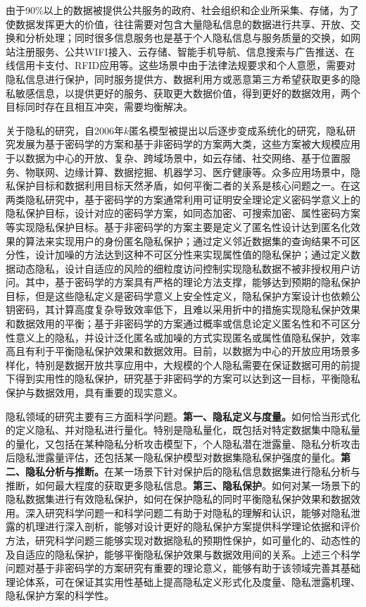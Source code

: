 \documentclass[pdftex,notypeinfo,twoside,openany,UTF8,fntef]{CASthesis}
\theoremstyle{THrm}{
	\newtheorem{question}{Question}[section]
	\newtheorem{property}{性质}[section]
	\newtheorem{assumption}{假设}[section]
	\newtheorem{claim}[lemma]{断言}
	
}
\begin{document}
由于90\%以上的数据被提供公共服务的政府、社会组织和企业所采集、存储，为了使数据发挥更大的价值，往往需要对包含大量隐私信息的数据进行共享、开放、交换和分析处理；同时很多信息服务也是基于个人隐私信息与服务质量的交换，如网站注册服务、公共WIFI接入、云存储、智能手机导航、信息搜索与广告推送、在线信用卡支付、RFID应用等。这些场景中由于法律法规要求和个人意愿，需要对隐私信息进行保护，同时服务提供方、数据利用方或恶意第三方希望获取更多的隐私敏感信息，以提供更好的服务、获取更大数据价值，得到更好的数据效用，两个目标同时存在且相互冲突，需要均衡解决。

关于隐私的研究，自2006年$k$匿名模型被提出以后逐步变成系统化的研究，隐私研究发展为基于密码学的方案和基于非密码学的方案两大类，这些方案被大规模应用于以数据为中心的开放、复杂、跨域场景中，如云存储、社交网络、基于位置服务、物联网、边缘计算、数据挖掘、机器学习、医疗健康等。众多应用场景中，隐私保护目标和数据利用目标天然矛盾，如何平衡二者的关系是核心问题之一。在这两类隐私研究中，基于密码学的方案通常利用可证明安全理论定义密码学意义上的隐私保护目标，设计对应的密码学方案，如同态加密、可搜索加密、属性密码方案等实现隐私保护目标。基于非密码学的方案主要是定义了匿名性设计达到匿名化效果的算法来实现用户的身份匿名隐私保护；通过定义邻近数据集的查询结果不可区分性，设计加噪的方法达到这种不可区分性来实现属性值的隐私保护；通过定义数据动态隐私，设计自适应的风险的细粒度访问控制实现隐私数据不被非授权用户访问。其中，基于密码学的方案具有严格的理论方法支撑，能够达到预期的隐私保护目标，但是这些隐私定义是密码学意义上安全性定义，隐私保护方案设计也依赖公钥密码，其计算高度复杂导致效率低下，且难以采用折中的措施实现隐私保护效果和数据效用的平衡；基于非密码学的方案通过概率或信息论定义匿名性和不可区分性意义上的隐私，并设计泛化匿名或加噪的方式实现匿名或属性值隐私保护，效率高且有利于平衡隐私保护效果和数据效用。目前，以数据为中心的开放应用场景多样化，特别是数据开放共享应用中，大规模的个人隐私需要在保证数据可用的前提下得到实用性的隐私保护，研究基于非密码学的方案可以达到这一目标，平衡隐私保护与数据效用，具有重要的现实意义。

隐私领域的研究主要有三方面科学问题。\textbf{第一、隐私定义与度量。}如何恰当形式化的定义隐私、并对隐私进行量化。特别是隐私量化，既包括对特定数据集中隐私量的量化，又包括在某种隐私分析攻击模型下，个人隐私潜在泄露量、隐私分析攻击后隐私泄露量评估，还包括某一隐私保护模型对数据集隐私保护强度的量化。\textbf{第二、隐私分析与推断。}在某一场景下针对保护后的隐私信息数据集进行隐私分析与推断，如何最大程度的获取更多隐私信息。\textbf{第三、隐私保护}。如何对某一场景下的隐私数据集进行有效隐私保护，如何在保护隐私的同时平衡隐私保护效果和数据效用。深入研究科学问题一和科学问题二有助于对隐私的理解和认识，能够对隐私泄露的机理进行深入剖析，能够对设计更好的隐私保护方案提供科学理论依据和评价方法，研究科学问题三能够实现对数据隐私的预期性保护，如可量化的、动态性的及自适应的隐私保护，能够平衡隐私保护效果与数据效用间的关系。上述三个科学问题对基于非密码学的方案研究有重要的理论意义，能够有助于该领域完善其基础理论体系，可在保证其实用性基础上提高隐私定义形式化及度量、隐私泄露机理、隐私保护方案的科学性。
\end{document}

